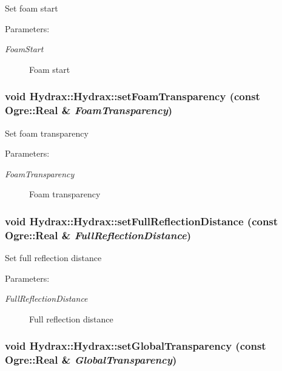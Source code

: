 Set foam start \begin{Desc}
\item[Parameters:]
\begin{description}
\item[{\em FoamStart}]Foam start \end{description}
\end{Desc}
\hypertarget{class_hydrax_1_1_hydrax_031be3ce2201a6087ecb6185309acc4e}{
\subsubsection[{setFoamTransparency}]{\setlength{\rightskip}{0pt plus 5cm}void Hydrax::Hydrax::setFoamTransparency (const Ogre::Real \& {\em FoamTransparency})}}
\label{class_hydrax_1_1_hydrax_031be3ce2201a6087ecb6185309acc4e}


Set foam transparency \begin{Desc}
\item[Parameters:]
\begin{description}
\item[{\em FoamTransparency}]Foam transparency \end{description}
\end{Desc}
\hypertarget{class_hydrax_1_1_hydrax_e4a765e38a2d81a180b9e74a002e8010}{
\subsubsection[{setFullReflectionDistance}]{\setlength{\rightskip}{0pt plus 5cm}void Hydrax::Hydrax::setFullReflectionDistance (const Ogre::Real \& {\em FullReflectionDistance})}}
\label{class_hydrax_1_1_hydrax_e4a765e38a2d81a180b9e74a002e8010}


Set full reflection distance \begin{Desc}
\item[Parameters:]
\begin{description}
\item[{\em FullReflectionDistance}]Full reflection distance \end{description}
\end{Desc}
\hypertarget{class_hydrax_1_1_hydrax_b601c8008ca2bc47e66d9a5e4e4b63a7}{
\subsubsection[{setGlobalTransparency}]{\setlength{\rightskip}{0pt plus 5cm}void Hydrax::Hydrax::setGlobalTransparency (const Ogre::Real \& {\em GlobalTransparency})}}
\label{class_hydrax_1_1_hydrax_b601c8008ca2bc47e66d9a5e4e4b63a7}



